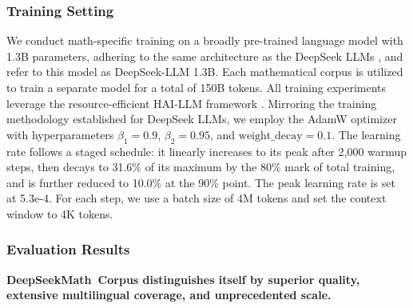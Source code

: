 \subsubsection{Training Setting}
\label{sec:quality-policy}
We conduct math-specific training on a broadly pre-trained language model with 1.3B parameters, adhering to the same architecture as the DeepSeek LLMs \citep{deepseek-llm}, and refer to this model as DeepSeek-LLM 1.3B. Each mathematical corpus is utilized to train a separate model for a total of 150B tokens. All training experiments leverage the resource-efficient HAI-LLM framework \citep{haillm}. Mirroring the training methodology established for DeepSeek LLMs, we employ the AdamW optimizer \citep{adamW} with hyperparameters $\beta_1=0.9$, $\beta_2=0.95$, and $\mathrm{weight\_decay}=0.1$. The learning rate follows a staged schedule: it linearly increases to its peak after 2,000 warmup steps, then decays to 31.6\% of its maximum by the 80\% mark of total training, and is further reduced to 10.0\% at the 90\% point. The peak learning rate is set at 5.3e-4. For each step, we use a batch size of 4M tokens and set the context window to 4K tokens.

\subsubsection{Evaluation Results}

\textbf{DeepSeekMath~Corpus distinguishes itself by superior quality, extensive multilingual coverage, and unprecedented scale.}

